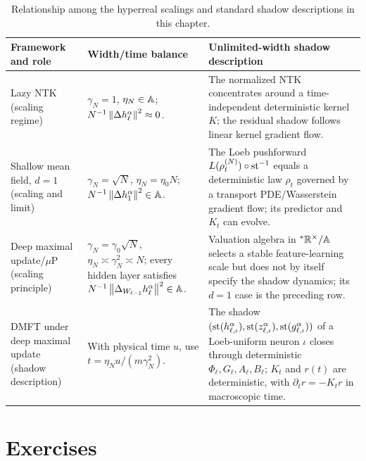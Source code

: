 \begin{table}[t]
\centering
\small
\begin{tabularx}{\textwidth}{@{}>{\raggedright\arraybackslash}p{}>{\raggedright\arraybackslash}p{}>{\raggedright\arraybackslash}X@{}}
\toprule
Framework and role & Width/time balance & Unlimited-width shadow description \\
\midrule
Lazy NTK (scaling regime) & $\gamma_N = 1$, $\eta_N \in \mathbb{A}$; $N^{-1}\left\lVert \Delta h_\ell^\alpha \right\rVert^2 \approx 0$. & The normalized NTK concentrates around a time-independent deterministic kernel $K$; the residual shadow follows linear kernel gradient flow. \\[0.45em]
Shallow mean field, $d = 1$ (scaling and limit) & $\gamma_N = \sqrt{N}$, $\eta_N = \eta_0 N$; $N^{-1}\left\lVert \Delta h_1^\alpha \right\rVert^2 \in \mathbb{A}$. & The Loeb pushforward $L(\rho_t^{(N)}) \circ \operatorname{st}^{-1}$ equals a deterministic law $\rho_t$ governed by a transport PDE/Wasserstein gradient flow; its predictor and $K_t$ can evolve. \\[0.45em]
Deep maximal update/$\mu$P (scaling principle) & $\gamma_N = \gamma_0\sqrt{N}$, $\eta_N \asymp \gamma_N^2 \asymp N$; every hidden layer satisfies $N^{-1}\left\lVert \Delta_{W_{\ell-1}} h_\ell^\alpha \right\rVert^2 \in \mathbb{A}$. & Valuation algebra in ${}^*\mathbb{R}^\times / \mathbb{A}$ selects a stable feature-learning scale but does not by itself specify the shadow dynamics; its $d = 1$ case is the preceding row. \\[0.45em]
DMFT under deep maximal update (shadow description) & With physical time $u$, use $t = \eta_N u / (m\gamma_N^2)$. & The shadow $(\operatorname{st}(h_{\ell,\iota}^\alpha), \operatorname{st}(z_{\ell,\iota}^\alpha), \operatorname{st}(g_{\ell,\iota}^\alpha))$ of a Loeb-uniform neuron $\iota$ closes through deterministic $\Phi_\ell, G_\ell, A_\ell, B_\ell$; $K_t$ and $r(t)$ are deterministic, with $\partial_t r = -K_t r$ in macroscopic time. \\
\bottomrule
\end{tabularx}
\caption{Relationship among the hyperreal scalings and standard shadow descriptions in this chapter.}
\label{tab:4.2}
\end{table}

\section{Exercises}
\label{sec:4.7}

